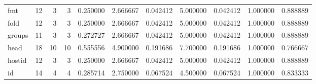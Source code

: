 \begin{longtable}{lrrrrrrrrrr}
fmt       &                                      12 &                  3 &                                 3 &                                   0.250000 &                               2.666667 &                                     0.042412 &                          5.000000 &                                0.042412 &                           1.000000 &                                           0.888889 \\
fold      &                                      12 &                  3 &                                 3 &                                   0.250000 &                               2.666667 &                                     0.042412 &                          5.000000 &                                0.042412 &                           1.000000 &                                           0.888889 \\
groups    &                                      11 &                  3 &                                 3 &                                   0.272727 &                               2.666667 &                                     0.042412 &                          5.000000 &                                0.042412 &                           1.000000 &                                           0.888889 \\
head      &                                      18 &                 10 &                                10 &                                   0.555556 &                               4.900000 &                                     0.191686 &                          7.700000 &                                0.191686 &                           1.000000 &                                           0.766667 \\
hostid    &                                      12 &                  3 &                                 3 &                                   0.250000 &                               2.666667 &                                     0.042412 &                          5.000000 &                                0.042412 &                           1.000000 &                                           0.888889 \\
id        &                                      14 &                  4 &                                 4 &                                   0.285714 &                               2.750000 &                                     0.067524 &                          4.500000 &                                0.067524 &                           1.000000 &                                           0.833333 \\

\end{longtable}
